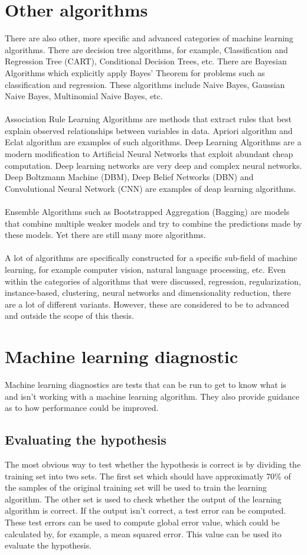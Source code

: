 \section{Other algorithms}
There are also other, more specific and advanced categories of machine learning algorithms. There are decision tree algorithms, for example, Classification and Regression Tree (CART), Conditional Decision Trees, etc. There are Bayesian Algorithms which explicitly apply Bayes’ Theorem for problems such as classification and regression. These algorithms include Naive Bayes, Gaussian Naive Bayes, Multinomial Naive Bayes, etc. \cite{mlcat} \\\\
Association Rule Learning Algorithms are methods that extract rules that best explain observed relationships between variables in data. Apriori algorithm and Eclat algorithm are examples of such algorithms. Deep Learning Algorithms are a modern modification to Artificial Neural Networks that exploit abundant cheap computation. Deep learning networks are very deep and complex neural networks. Deep Boltzmann Machine (DBM), Deep Belief Networks (DBN) and Convolutional Neural Network (CNN) are examples of deap learning algorithms.  \cite{mlcat}\\\\
Ensemble Algorithms such as Bootstrapped Aggregation (Bagging) are models that combine multiple weaker models and try to combine the predictions made by these models. Yet there are still many more algorithms.  \cite{mlcat}\\\\
A lot of algorithms are specifically constructed for a specific sub-field of machine learning, for example computer vision, natural language processing, etc. Even within the categories of algorithms that were discussed, regression, regularization, instance-based, clustering, neural networks and dimensionality reduction, there are a lot of different variants. However, these are considered to be to advanced and outside the scope of this thesis. 

\section{Machine learning diagnostic}
Machine learning diagnostics are tests that can be run to get to know what is and isn't working with a machine learning algorithm. They also provide guidance as to how performance could be improved. 

\subsection{Evaluating the hypothesis}
The most obvious way to test whether the hypothesis is correct is by dividing the training set into two sets. The first set which should have approximatly 70\% of the samples of the original training set will be used to train the learning algorithm. The other set is used to check whether the output of the learning algorithm is correct. If the output isn't correct, a test error can be computed. These test errors can be used to compute global error value, which could be calculated by, for example, a mean squared error. This value can be used ito evaluate the hypothesis.

